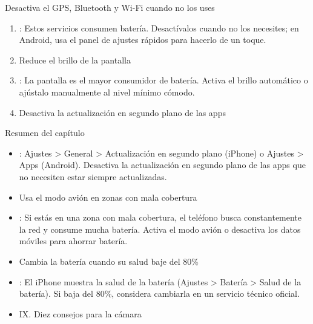 \begin{tcbpractice}{Desactiva el GPS, Bluetooth y Wi-Fi cuando no los uses}
\begin{enumerate}
  \item : Estos servicios consumen batería. Desactívalos cuando no los necesites; en Android, usa el panel de ajustes rápidos para hacerlo de un toque.
  \item Reduce el brillo de la pantalla
  \item : La pantalla es el mayor consumidor de batería. Activa el brillo automático o ajústalo manualmente al nivel mínimo cómodo.
  \item Desactiva la actualización en segundo plano de las apps
\end{enumerate}

\end{tcbpractice}

\begin{tcbsummary}{Resumen del capítulo}
\begin{itemize}
  \item : Ajustes > General > Actualización en segundo plano (iPhone) o Ajustes > Apps (Android). Desactiva la actualización en segundo plano de las apps que no necesiten estar siempre actualizadas.
  \item Usa el modo avión en zonas con mala cobertura
  \item : Si estás en una zona con mala cobertura, el teléfono busca constantemente la red y consume mucha batería. Activa el modo avión o desactiva los datos móviles para ahorrar batería.
  \item Cambia la batería cuando su salud baje del 80\%
  \item : El iPhone muestra la salud de la batería (Ajustes > Batería > Salud de la batería). Si baja del 80\%, considera cambiarla en un servicio técnico oficial.
  \item IX. Diez consejos para la cámara
\end{itemize}

\end{tcbsummary}
